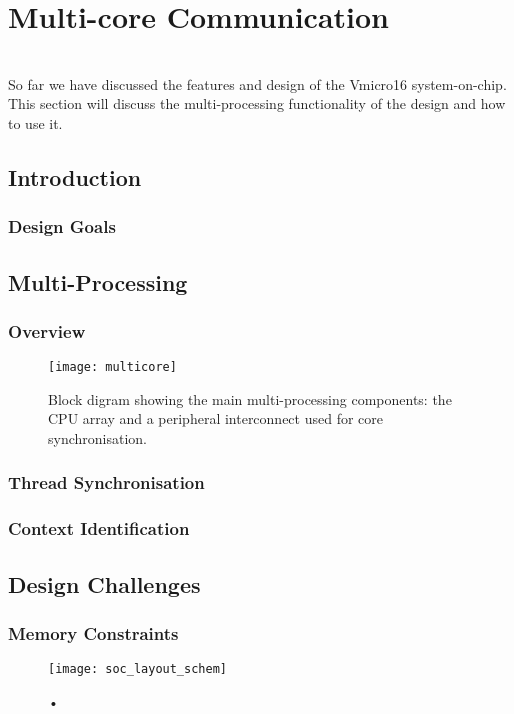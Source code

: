 
\chapter{Multi-core Communication}
\startcontents[chapters]

\noindent\\
So far we have discussed the features and design of the Vmicro16 system-on-chip. This section will discuss the multi-processing functionality of the design and how to use it.

\section{Introduction}
\subsection{Design Goals}
\section{Multi-Processing}
\subsection{Overview}


\begin{figure}[h]
\centering
\texttt{[image: multicore]}
\caption{Block digram showing the main multi-processing components: the CPU array and a peripheral interconnect used for core synchronisation.}
\label{}
\end{figure}

\subsection{Thread Synchronisation}
\subsection{Context Identification}

\section{Design Challenges}
\subsection{Memory Constraints}


\begin{figure}[H]
\centering
\texttt{[image: soc\_layout\_schem]}
\caption{•}
\label{}
\end{figure}